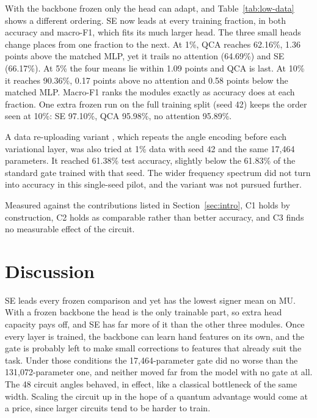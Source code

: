 \documentclass[10pt,twocolumn]{article}
\newcommand{\QCA}{QCA}
\begin{document}
With the backbone frozen only the head can adapt, and
Table~\ref{tab:low-data} shows a different ordering. SE now leads at every
training fraction, in both accuracy and macro-F1, which fits its much larger
head. The three small heads change places from one fraction to the next. At
1\%, \QCA{} reaches 62.16\%, 1.36 points above the matched MLP, yet it
trails no attention (64.69\%) and SE (66.17\%). At 5\% the four means lie
within 1.09 points and \QCA{} is last. At 10\% it reaches 90.36\%, 0.17
points above no attention and 0.58 points below the matched MLP. Macro-F1 ranks the modules
exactly as accuracy does at each fraction. One extra frozen run on the full
training split (seed 42) keeps the order seen at 10\%: SE 97.10\%, \QCA{}
95.98\%, no attention 95.89\%.



A data re-uploading variant \citep{perez_2020_reupload}, which repeats the
angle encoding before each variational layer, was also tried at 1\% data
with seed 42 and the same 17,464 parameters. It reached 61.38\% test
accuracy, slightly below the 61.83\% of the standard gate trained with that
seed. The wider frequency spectrum did not turn into accuracy in this
single-seed pilot, and the variant was not pursued further.

Measured against the contributions listed in Section~\ref{sec:intro}, C1
holds by construction, C2 holds as comparable rather than better accuracy,
and C3 finds no measurable effect of the circuit.

\section{Discussion}
\label{sec:discussion}

SE leads every frozen comparison and yet has the lowest signer mean on MU.
With a frozen backbone the head is the only trainable part, so extra head capacity pays
off, and SE has far more of it than the other three modules. Once every
layer is trained, the backbone can learn hand features on its own, and the
gate is probably left to make small corrections to features that already
suit the task. Under those conditions the 17,464-parameter gate did no worse
than the 131,072-parameter one, and neither moved far from the model with
no gate at all. The 48 circuit angles behaved, in effect, like a classical
bottleneck of the same width. Scaling the circuit up in the hope of a
quantum advantage would come at a price, since larger circuits tend to be
harder to train.
\end{document}

